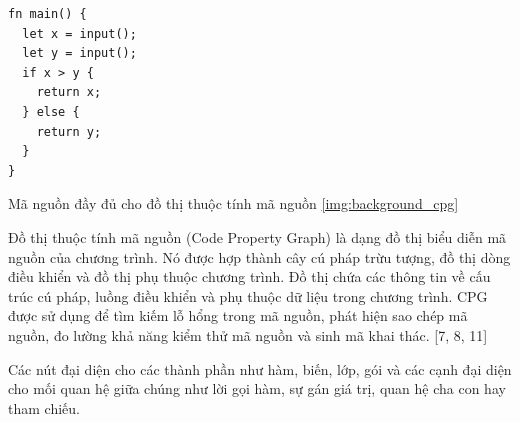 \begin{listing}[H]
\begin{verbatim}
fn main() {
  let x = input();
  let y = input();
  if x > y {
    return x;
  } else {
    return y;
  }
}
\end{verbatim}
\caption{Mã nguồn đầy đủ cho đồ thị thuộc tính mã nguồn \ref{img:background_cpg}}
\label{code:background_cpg}
\end{listing}

Đồ thị thuộc tính mã nguồn (Code Property Graph) là dạng đồ thị biểu diễn mã
nguồn của chương trình. Nó được hợp thành cây cú pháp trừu tượng, đồ thị dòng điều khiển và đồ thị phụ thuộc chương trình. Đồ thị chứa các thông tin về cấu trúc cú pháp,
luồng điều khiển và phụ thuộc dữ liệu trong chương trình. CPG được sử dụng để tìm
kiếm lỗ hổng trong mã nguồn, phát hiện sao chép mã nguồn, đo lường khả năng kiểm
thử mã nguồn và sinh mã khai thác. [7, 8, 11]

Các nút đại diện cho các thành phần như hàm, biến, lớp, gói và các cạnh đại diện
cho mối quan hệ giữa chúng như lời gọi hàm, sự gán giá trị, quan hệ cha con hay tham
chiếu.